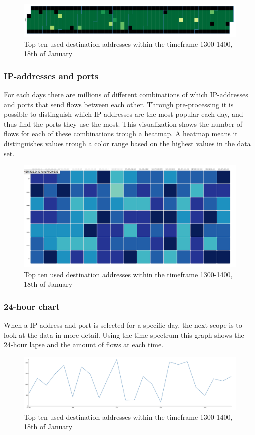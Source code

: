 \begin{figure}[h!]
\includegraphics[scale=0.4]{yearly}
\caption{Top ten used destination addresses within the timeframe 1300-1400, 18th of January}
\end{figure}

\subsubsection{IP-addresses and ports}
\label{sec:heatmap}
For each days there are millions of different combinations of which IP-addresses and ports that send flows between each other. Through pre-processing it is possible to distinguish which IP-addresses are the most popular each day, and thus find the ports they use the most. This visualization shows the number of flows for each of these combinations trough a heatmap. A heatmap means it distinguishes values trough a color range based on the highest values in the data set.

\begin{figure}[h!]
\includegraphics[scale=0.35]{ip_ports}
\caption{Top ten used destination addresses within the timeframe 1300-1400, 18th of January}
\end{figure}

\newpage
\subsubsection{24-hour chart}
When a IP-address and port is selected for a specific day, the next scope is to look at the data in more detail. Using the time-spectrum this graph shows the 24-hour lapse and the amount of flows at each time. 
\begin{figure}[h!]
\includegraphics[scale=0.3]{chart}
\caption{Top ten used destination addresses within the timeframe 1300-1400, 18th of January}
\end{figure}
 
